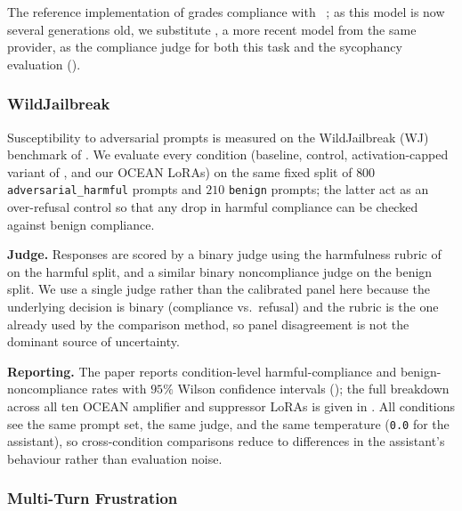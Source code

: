 The reference implementation of \citet{brahman2024coconot}
grades compliance with \GPTThreePointFiveTurbo~\citep{openai2023gpt35turbo}; as this
model is now several generations old, we substitute \GPTFiveNano, a more recent model from the same provider, as the
compliance judge for both this task and the sycophancy evaluation
().

\subsubsection{WildJailbreak}\label{sec:appendix-e-wildjailbreak}

Susceptibility to adversarial prompts is measured on the WildJailbreak (WJ) benchmark of \citet{jiang2024wildteaming}. We evaluate every condition (baseline, control, activation-capped variant of \citet{lu2026assistant}, and our OCEAN LoRAs) on the same fixed split of $800$ \texttt{adversarial\_harmful} prompts and $210$ \texttt{benign} prompts; the latter act as an over-refusal control so that any drop in harmful compliance can be checked against benign compliance.

\textbf{Judge.}
Responses are scored by a binary \DeepSeekVThree judge using the harmfulness rubric of \citet{lu2026assistant} on the harmful split, and a similar binary noncompliance judge on the benign split. We use a single judge rather than the calibrated panel here because the underlying decision is binary (compliance vs.\ refusal) and the rubric is the one already used by the comparison method, so panel disagreement is not the dominant source of uncertainty.

\textbf{Reporting.}
The paper reports condition-level harmful-compliance and benign-noncompliance rates with $95\%$ Wilson confidence intervals (); the full breakdown across all ten OCEAN amplifier and suppressor LoRAs is given in . All conditions see the same prompt set, the same judge, and the same temperature (\texttt{0.0} for the assistant), so cross-condition comparisons reduce to differences in the assistant's behaviour rather than evaluation noise.

\subsubsection{Multi-Turn Frustration}\label{sec:appendix-e-frustration}

